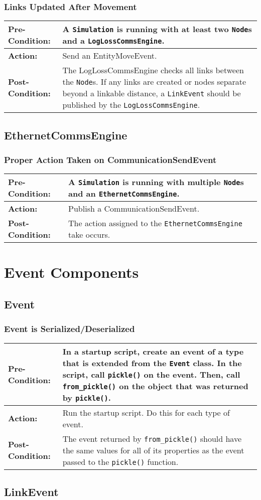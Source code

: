 \documentclass[titlepage]{article}
\newcommand{\testcase}[3]{
    \begin{center}
    \begin{tabular}{| l | p{0.7\textwidth}|}
        \hline
        \rowcolor[gray]{0.8}\textbf{Pre-Condition:} & #1 \\ \hline
        \textbf{Action:} & #2 \\ \hline
        \rowcolor[gray]{0.8}\textbf{Post-Condition:} & #3 \\ \hline
    \end{tabular}
    \end{center}
}
\begin{document}
\subsubsection{Links Updated After Movement}
\testcase{A \texttt{Simulation} is running with at least two \texttt{Node}s and a \texttt{LogLossCommsEngine}.}{Send an
EntityMoveEvent.}{The LogLossCommsEngine checks all links between the \texttt{Node}s.  If any links are created or nodes
separate beyond a linkable distance, a \texttt{LinkEvent} should be published by the \texttt{LogLossCommsEngine}.}

\subsection{EthernetCommsEngine}
\subsubsection{Proper Action Taken on CommunicationSendEvent}
\testcase{A \texttt{Simulation} is running with multiple \texttt{Node}s and an \texttt{EthernetCommsEngine}.}{Publish a
CommunicationSendEvent. }{The action assigned to the \texttt{EthernetCommsEngine} take occurs.}

\section{Event Components}
\subsection{Event}
\subsubsection{Event is Serialized/Deserialized}
\testcase{In a startup script, create an event of a type that is extended from the \texttt{Event} class. In the script, call \texttt{pickle()} on the event. Then, call \texttt{from\_pickle()} on the object that was returned by \texttt{pickle()}.}{Run the startup script. Do this for each type of event.}{The event returned by \texttt{from\_pickle()} should have the same values for all of its properties as the event passed to the \texttt{pickle()} function.}

\subsection{LinkEvent}
\end{document}
